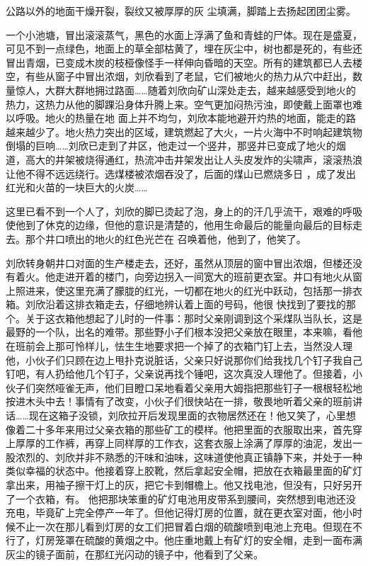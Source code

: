 \documentclass{article}
\begin{document}
公路以外的地面干燥开裂，裂纹又被厚厚的灰
尘填满，脚踏上去扬起团团尘雾。 

一个小池塘，冒出滚滚蒸气，黑色的水面上浮满了鱼和青蛙的尸体。现在是盛夏，可见不到一点绿色，地面上的草全部枯黄了，埋在灰尘中，树也都是死的，有些还冒出青烟，已变成木炭的枝桠像怪手一样伸向昏暗的天空。所有的建筑都已人去楼空，有些从窗子中冒出浓烟，刘欣看到了老鼠，它们被地火的热力从穴中赶出，数量惊人，大群大群地拥过路面……随着刘欣向矿山深处走去，越来越感受到地火的热力，这热力从他的脚踝沿身体升腾上来。空气更加闷热污浊，即使戴上面罩也难以呼吸。地火的热量在地
\newpage
面上并不均匀，刘欣本能地避开灼热的地面，能走的路越来越少了。地火热力突出的区域，建筑燃起了大火，一片火海中不时响起建筑物倒塌的巨响……刘欣已走到了井区，他走过一个竖井，那竖井已变成了地火的烟道，高大的井架被烧得通红，热流冲击井架发出让人头皮发炸的尖啸声，滚滚热浪让他不得不远远绕行。选煤楼被浓烟吞没了，后面的煤山已燃烧多日
，成了发出红光和火苗的一块巨大的火炭…… 

这里已看不到一个人了，刘欣的脚已烫起了泡，身上的的汗几乎流干，艰难的呼吸使他到了休克的边缘，但他的意识是清楚的，他用生命最后的能量向最后的目标走去。那个井口喷出的地火的红色光芒在
召唤着他，他到了，他笑了。 

刘欣转身朝井口对面的生产楼走去，还好，虽然从顶层的窗中冒出浓烟，但楼还没有着火。他走进开着的楼门，向旁边拐入一间宽大的班前更衣室。井口有地火从窗上照进来，使这里充满了朦胧的红光，一切都在地火的红光中跃动，包括那一排衣箱。刘欣沿着这排衣箱走去，仔细地辨认着上面的号码，他很
\newpage
快找到了要找的那个。关于这衣箱他想起了儿时的一件事：那时父亲刚调到这个采煤队当队长，这是最野的一个队，出名的难带。那些野小子们根本没把父亲放在眼里，本来嘛，看他在班前会上那可怜样儿，怯生生地要求把一个掉了的衣箱门钉上去，当然没人理他，小伙子们只顾在边上甩扑克说脏话，父亲只好说那你们给我找几个钉子我自己钉吧，有人扔给他几个钉子，父亲说再找个锤吧，这次真没人理他了。但接着，小伙子们突然哑雀无声，他们目瞪口呆地看着父亲用大姆指把那些钉子一根根轻松地按进木头中去！事情有了改变，小伙子们很快站在一排，敬畏地听着父亲的班前讲话……现在这箱子没锁，刘欣拉开后发现里面的衣物居然还在！他又笑了，心里想像着二十多年来用过父亲衣箱的那些矿工的模样。他把里面的衣服取出来，首先穿上厚厚的工作裤，再穿上同样厚的工作衣，这套衣服上涂满了厚厚的油泥，发出一股浓烈的、刘欣并非不熟悉的汗味和油味，这味道使他真正镇静下来，并处于一种类似幸福的状态中。他接着穿上胶靴，然后拿起安全帽，把放在衣箱最里面的矿灯拿出来，用袖子擦干灯上的灰，把它卡到帽檐上。他又找电池，但没有，只好另开了一个衣箱，有。
\newpage
他把那块笨重的矿灯电池用皮带系到腰间，突然想到电池还没充电，毕竟矿上完全停产一年了。但他记得灯房的位置，就在更衣室对面，他小时候不止一次在那儿看到灯房的女工们把冒着白烟的硫酸喷到电池上充电。但现在不行了，灯房笼罩在硫酸的黄烟之中。他庄重地戴上有矿灯的安全帽，走到一面布满灰尘的镜子面前，在那红光闪动的镜子中，他看到了父亲。
\end{document}
